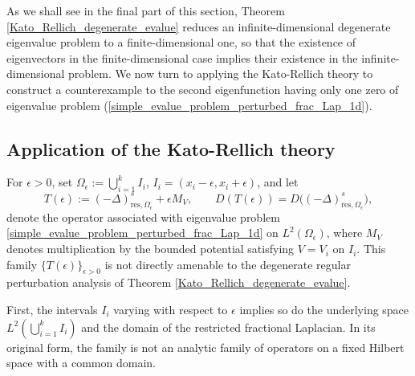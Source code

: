 \documentclass[preprint,12pt]{elsarticle}
\newtheorem*{remark}{Remark}
\begin{document}
As we shall see in the final part of this section, Theorem \ref{Kato_Rellich_degenerate_evalue} reduces an infinite-dimensional degenerate eigenvalue problem to a finite-dimensional one, so that the existence of eigenvectors in the finite-dimensional case implies their existence in the infinite-dimensional problem. We now turn to applying the Kato-Rellich theory to construct a counterexample to the second eigenfunction having only one zero of eigenvalue problem (\ref{simple_evalue_problem_perturbed_frac_Lap_1d}).

\subsection{Application of the Kato-Rellich theory}\label{sec_KatoRellich_app}
For $\epsilon>0$, set $\Omega_\epsilon:=\bigcup_{i=1}^k I_i$, $I_i=(x_i-\epsilon,x_i+\epsilon)$, and let
\[
    T(\epsilon)
    :=(-\Delta)^s_{\mathrm{res},\Omega_\epsilon}
      +\epsilon M_V,
    \qquad
    D(T(\epsilon))
    =D\bigl((-\Delta)^s_{\mathrm{res},\Omega_\epsilon}\bigr),
\]
denote the operator associated with eigenvalue problem
\eqref{simple_evalue_problem_perturbed_frac_Lap_1d} on
$L^2(\Omega_\epsilon)$, where $M_V$ denotes multiplication by the bounded potential satisfying $V=V_i$ on $I_i$. This family $\{T(\epsilon)\}_{\epsilon>0}$ is not directly amenable to the degenerate regular perturbation analysis of Theorem \ref{Kato_Rellich_degenerate_evalue}.

First, the intervals $I_i$ varying with respect to $\epsilon$ implies so do the underlying space $L^2\left(\bigcup_{i=1}^k I_i\right)$
and the domain of the restricted fractional Laplacian. 
In its original form, the family is not an analytic family of operators on a fixed Hilbert space with a common domain.
\end{document}
